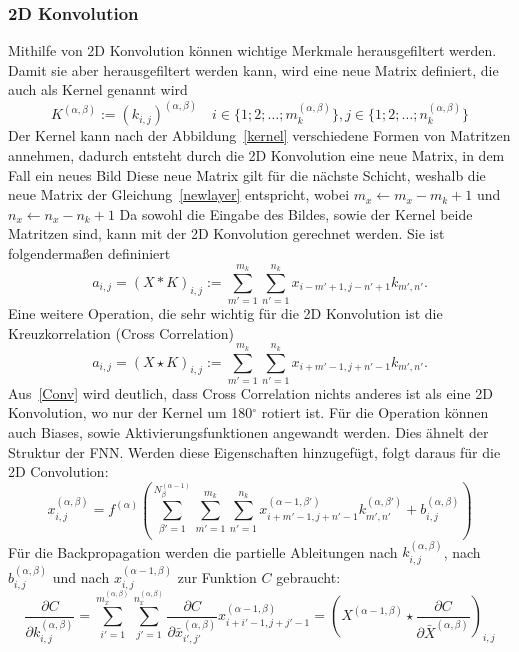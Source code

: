 \documentclass[11pt]{article}
\begin{document}
\subsubsection{2D Konvolution}
Mithilfe von 2D Konvolution können wichtige Merkmale herausgefiltert werden. Damit sie aber herausgefiltert werden kann, wird
eine neue Matrix definiert, die auch als Kernel genannt wird
\begin{equation}
    K^{(\alpha,\beta)}:={(k_{i,j})}^{(\alpha,\beta)} \quad i \in\{1;2;\ldots;m_{k}^{(\alpha,\beta)}\}, j \in\{1;2;\ldots;n_{k}^{(\alpha,\beta)}\}
\end{equation}
Der Kernel kann nach der Abbildung~\ref{kernel} verschiedene Formen von Matritzen annehmen, dadurch entsteht durch die 2D Konvolution eine neue Matrix, in dem Fall ein neues Bild
Diese neue Matrix gilt für die nächste Schicht, weshalb die neue Matrix der Gleichung~\ref{newlayer} entspricht, wobei $ m_x \leftarrow m_x - m_k + 1 $ und $ n_x \leftarrow n_x - n_k + 1 $
Da sowohl die Eingabe des Bildes, sowie der Kernel beide Matritzen sind, kann mit der 2D Konvolution gerechnet werden. Sie ist
folgendermaßen defininiert
\begin{equation}
    a_{i,j} = {(X \ast K)}_{i,j} := \sum_{m'=1}^{m_{k}} \sum_{n'=1}^{n_{k}} x_{i-m'+1,j-n'+1}k_{m',n'}. \label{Conv}
\end{equation}
Eine weitere Operation, die sehr wichtig für die 2D Konvolution ist die Kreuzkorrelation (Cross Correlation)
\begin{equation}
    a_{i,j} = {(X \star K)}_{i,j} := \sum_{m'=1}^{m_{k}} \sum_{n'=1}^{n_{k}} x_{i+m'-1,j+n'-1}k_{m',n'}.
\end{equation}
Aus~\eqref{Conv} wird deutlich, dass Cross Correlation nichts anderes ist als eine 2D Konvolution, wo nur der Kernel um 180$^{\circ}$
rotiert ist. Für die Operation können auch Biases, sowie Aktivierungsfunktionen angewandt werden. Dies ähnelt der Struktur der FNN.\@
Werden diese Eigenschaften hinzugefügt, folgt daraus für die 2D Convolution:
\begin{equation}
    x_{i,j}^{(\alpha,\beta)} = f^{(\alpha)}(\sum_{\beta'=1}^{N_{\beta}^{(\alpha-1)}} \sum_{m'=1}^{m_{k}} \sum_{n'=1}^{n_{k}} x_{i+m'-1,j+n'-1}^{(\alpha-1,\beta')}k_{m',n'}^{(\alpha,\beta')}+b_{i,j}^{(\alpha,\beta)})
\end{equation}
Für die Backpropagation werden die partielle Ableitungen nach $k_{i,j}^{(\alpha,\beta)}$, nach $b_{i,j}^{(\alpha,\beta)}$ und nach $x_{i,j}^{(\alpha-1,\beta)}$ zur Funktion $C$ gebraucht:
\begin{equation}
    \frac{\partial C}{\partial k_{i,j}^{(\alpha,\beta)}} = \sum_{i'=1}^{m_x^{(\alpha,\beta)}}\sum_{j'=1}^{n_x^{(\alpha,\beta)}} \frac{\partial C}{\partial \bar{x}_{i',j'}^{(\alpha,\beta)}}
    x_{i+i'-1,j+j'-1}^{(\alpha-1,\beta)} = {(X^{(\alpha-1,\beta)} \star \frac{\partial C}{\partial \bar{X}^{(\alpha,\beta)}})}_{i,j}
\end{equation}
\end{document}
